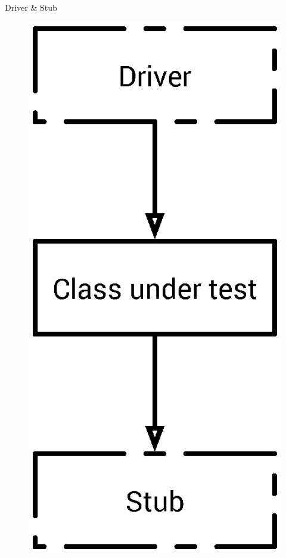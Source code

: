\documentclass[14pt]{beamer}
\begin{document}
\begin{frame}[plain]{Driver \& Stub}
    \begin{figure}
        \center
        \includegraphics[height=.8\textheight]{driver-and-stub}
        \label{fig:driver-and-stub}
    \end{figure}
\end{frame}
\end{document}
